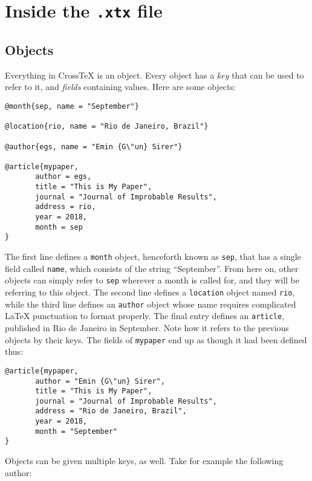 \documentclass{article}
\newcommand{\XTeX}{Cross\TeX}
\begin{document}
\section{Inside the \texttt{.xtx} file}

\subsection{Objects}

Everything in \XTeX{} is an object. Every object has a \textit{key} that can be used to refer to it, and \textit{fields} containing values. Here are some objects:

\begin{small}\begin{verbatim}
@month{sep, name = "September"}

@location{rio, name = "Rio de Janeiro, Brazil"}

@author{egs, name = "Emin {G\"un} Sirer"}

@article{mypaper,
	   author = egs,
	   title = "This is My Paper",
	   journal = "Journal of Improbable Results",
	   address = rio,
	   year = 2018,
	   month = sep
}
\end{verbatim}\end{small}

The first line defines a \texttt{month} object, henceforth known as \texttt{sep}, that has a single field called \texttt{name}, which consists of the string ``September''. From here on, other objects can simply refer to \texttt{sep} wherever a month is called for, and they will be referring to this object. The second line defines a \texttt{location} object named \texttt{rio}, while the third line defines an \texttt{author} object whose name requires complicated \LaTeX{} punctuation to format properly. The final entry defines an \texttt{article}, published in Rio de Janeiro in September. Note how it refers to the previous objects by their keys. The fields of \texttt{mypaper} end up as though it had been defined thus:

\begin{small}\begin{verbatim}
@article{mypaper,
	   author = "Emin {G\"un} Sirer",
	   title = "This is My Paper",
	   journal = "Journal of Improbable Results",
	   address = "Rio de Janeiro, Brazil",
	   year = 2018,
	   month = "September"
}
\end{verbatim}\end{small}

Objects can be given multiple keys, as well. Take for example the following author:
\end{document}
